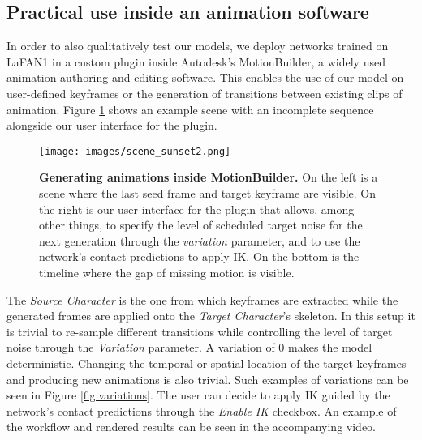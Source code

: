 \documentclass[acmtog]{acmart}
\begin{document}
\subsection{Practical use inside an animation software}
In order to also qualitatively test our models, we deploy networks trained on LaFAN1 in a custom plugin inside Autodesk's MotionBuilder, a widely used animation authoring and editing software. This enables the use of our model on user-defined keyframes or the generation of transitions between existing clips of animation. Figure \ref{fig:mobu} shows an example scene with an incomplete sequence alongside our user interface for the plugin. 
\begin{figure}[h]
\begin{center}
\centerline{\texttt{[image: images/scene\_sunset2.png]}}
  \caption{\textbf{Generating animations inside MotionBuilder.} On the left is a scene where the last seed frame and target keyframe are visible. On the right is our user interface for the plugin that allows, among other things, to specify the level of scheduled target noise for the next generation through the \textit{variation} parameter, and to use the network's contact predictions to apply IK. On the bottom is the timeline where the gap of missing motion is visible.}
  \label{fig:mobu}
\end{center}
\vspace{-0.5cm}
\end{figure}
The \textit{Source Character} is the one from which keyframes are extracted while the generated frames are applied onto the \textit{Target Character}'s skeleton. In this setup it is trivial to re-sample different transitions while controlling the level of target noise through the \textit{Variation} parameter. A variation of 0 makes the model deterministic. Changing the temporal or spatial location of the target keyframes and producing new animations is also trivial. Such examples of variations can be seen in Figure \ref{fig:variations}. The user can decide to apply IK guided by the network's contact predictions through the \textit{Enable IK} checkbox. An example of the workflow and rendered results can be seen in the accompanying video.
\end{document}
